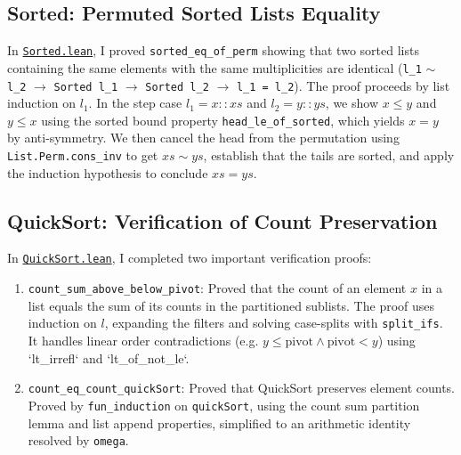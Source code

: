 \documentclass{article}
\begin{document}
\subsection{Sorted: Permuted Sorted Lists Equality}
In \href{file:///home/scorzion/Tech/Crypto/SKC_IITH/Day9/solutions/Sorted.lean}{\texttt{Sorted.lean}}, I proved \texttt{sorted\_eq\_of\_perm} showing that two sorted lists containing the same elements with the same multiplicities are identical (\texttt{l\_1} $\sim$ \texttt{l\_2} $\to$ \texttt{Sorted l\_1} $\to$ \texttt{Sorted l\_2} $\to$ \texttt{l\_1 = l\_2}).
The proof proceeds by list induction on $l_1$. In the step case $l_1 = x :: xs$ and $l_2 = y :: ys$, we show $x \le y$ and $y \le x$ using the sorted bound property \texttt{head\_le\_of\_sorted}, which yields $x = y$ by anti-symmetry. We then cancel the head from the permutation using \texttt{List.Perm.cons\_inv} to get $xs \sim ys$, establish that the tails are sorted, and apply the induction hypothesis to conclude $xs = ys$.

\subsection{QuickSort: Verification of Count Preservation}
In \href{file:///home/scorzion/Tech/Crypto/SKC_IITH/Day9/solutions/QuickSort.lean}{\texttt{QuickSort.lean}}, I completed two important verification proofs:
\begin{enumerate}
    \item \texttt{count\_sum\_above\_below\_pivot}: Proved that the count of an element $x$ in a list equals the sum of its counts in the partitioned sublists. The proof uses induction on $l$, expanding the filters and solving case-splits with \texttt{split\_ifs}. It handles linear order contradictions (e.g. $y \le \text{pivot} \land \text{pivot} < y$) using `lt\_irrefl` and `lt\_of\_not\_le`.
    \item \texttt{count\_eq\_count\_quickSort}: Proved that QuickSort preserves element counts. Proved by \texttt{fun\_induction} on \texttt{quickSort}, using the count sum partition lemma and list append properties, simplified to an arithmetic identity resolved by \texttt{omega}.
\end{enumerate}
\end{document}
